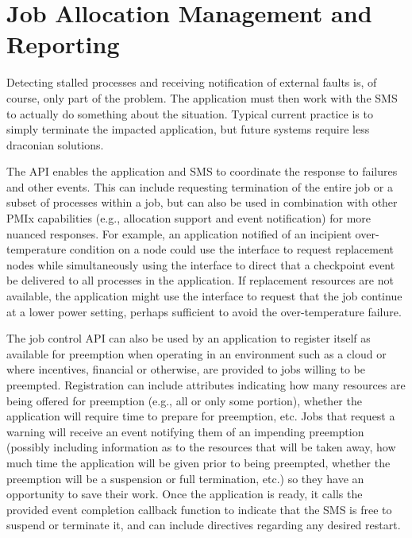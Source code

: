 \chapter{Job Allocation Management and Reporting}
\label{chap:api_job_mgmt}

Detecting stalled processes and receiving notification of external faults is, of course, only part of the problem. The application
must then work with the \ac{SMS} to actually do something about the situation. Typical current practice is to simply
terminate the impacted application, but future systems require less draconian solutions.

The  \ac{API} enables the application and \ac{SMS} to coordinate the response to failures and other events.
This can include requesting termination of the entire job or a subset of processes within a job, but can
also be used in combination with other \ac{PMIx} capabilities (e.g., allocation support and event notification) for more nuanced responses. For example, an application notified of an incipient over-temperature condition on a node could use the  interface to request replacement nodes while simultaneously using the  interface to direct that a checkpoint event be delivered to all processes in the application. If replacement resources are not available, the application might use the  interface to request that the job continue at a lower power setting, perhaps sufficient to avoid the over-temperature failure.

The job control API can also be used by an application to register itself as available for preemption when operating in an environment such as a cloud or where incentives, financial or otherwise, are provided to jobs willing to be preempted. Registration can include attributes indicating how many resources are being offered for preemption (e.g., all or only some portion), whether the application will require time to prepare for preemption, etc. Jobs that
request a warning will receive an event notifying them of an impending preemption (possibly including information as to the resources that will be taken away, how much time the application will be given prior to being preempted, whether the preemption will be a suspension or full termination, etc.) so they have an opportunity to save
their work. Once the application is ready, it calls the provided event completion callback function to indicate that
the SMS is free to suspend or terminate it, and can include directives regarding any desired restart.

